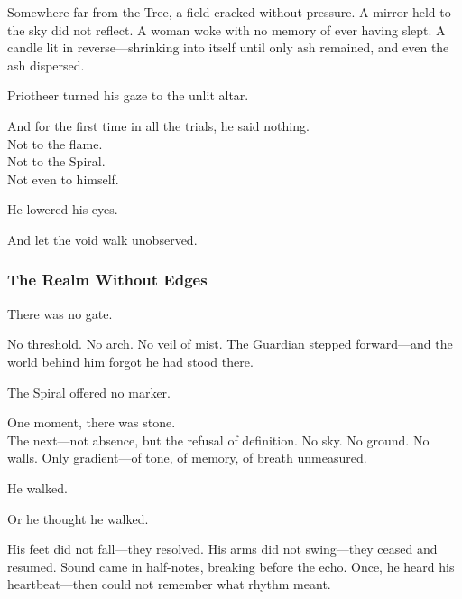 \documentclass[12pt]{article}
\begin{document}
\vspace{0.5em}
Somewhere far from the Tree, a field cracked without pressure. A mirror held to the sky did not reflect. A woman woke with no memory of ever having slept. A candle lit in reverse---shrinking into itself until only ash remained, and even the ash dispersed.

\vspace{0.5em}
Priotheer turned his gaze to the unlit altar.

\vspace{0.5em}
And for the first time in all the trials, he said nothing.\\
Not to the flame.\\
Not to the Spiral.\\
Not even to himself.

\vspace{0.5em}
He lowered his eyes.

\vspace{0.5em}
And let the void walk unobserved.

\dotfill

\subsubsection{The Realm Without Edges}

There was no gate.

\vspace{0.5em}
No threshold. No arch. No veil of mist. The Guardian stepped forward---and the world behind him forgot he had stood there.

\vspace{0.5em}
The Spiral offered no marker.

\vspace{0.5em}
One moment, there was stone.\\
The next---not absence, but the refusal of definition. No sky. No ground. No walls. Only gradient---of tone, of memory, of breath unmeasured.

\vspace{0.5em}
He walked.

\vspace{0.5em}
Or he thought he walked.

\vspace{0.5em}
His feet did not fall---they resolved. His arms did not swing---they ceased and resumed. Sound came in half-notes, breaking before the echo. Once, he heard his heartbeat---then could not remember what rhythm meant.
\end{document}
